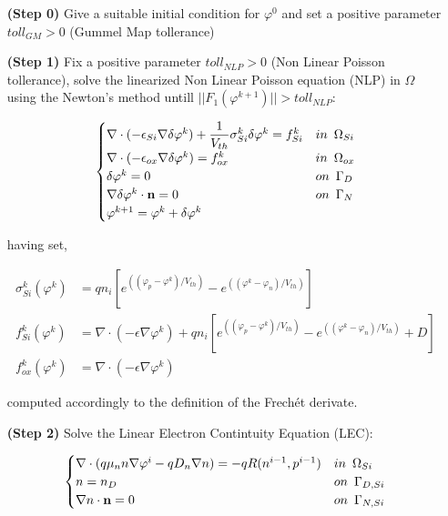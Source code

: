 \begin{itemize}


\item[\bf (Step 0)] Give a suitable initial condition for $\varphi^0$ and set a positive parameter $toll_{GM}>0$ (Gummel Map tollerance)

\item[\bf (Step 1)] Fix a positive parameter $toll_{NLP}>0$ (Non Linear Poisson tollerance), solve the linearized Non Linear Poisson equation (NLP) in $\Omega$ using the Newton's method untill $||F_1(\varphi^{k+1})||>toll_{NLP}$:


\begin{equation}
\label{eq: newton step NLP linear}
\begin{cases}

\nabla \cdot (-\epsilon_{Si} \nabla \delta\varphi^k) 
+   \dfrac{1}{V_{th}} \sigma_{Si}^k\delta\varphi^k 
 =  f_{Si}^k & in \psp{3} \Omega_{Si}
  \\
\nabla \cdot (-\epsilon_{ox} \nabla \delta\varphi^k) =  f_{ox}^k & in \psp{3} \Omega_{ox} 
\\
\delta \varphi^k = 0 & on \psp{3} \Gamma_D 
\\
\nabla \delta \varphi^k \cdot \vect{n} = 0 & on \psp{3} \Gamma_N
\\
\varphi^{k+1}=\varphi^k+\delta \varphi^k
\end{cases} 
\end{equation}

having set,

\begin{align*}
\sigma_{Si}^k(\varphi^{k}) & = qn_i \left[ e^{((\varphi_p-\varphi^k)/V_{th})}-e^{((\varphi^k-\varphi_n)/V_{th})} \right]
\\
f_{Si}^k(\varphi^k) & = \nabla \cdot (-\epsilon \nabla \varphi^k) + qn_i \left[ e^{((\varphi_p-\varphi^k)/V_{th})}-e^{((\varphi^k-\varphi_n)/V_{th})}  + D \right]
\\
f_{ox}^k(\varphi^k) & = \nabla \cdot (-\epsilon \nabla \varphi^k) 
\end{align*}

computed accordingly to the definition of the Frech\'et derivate.


\item[\bf (Step 2)] Solve the Linear Electron Contintuity Equation (LEC):

\begin{equation}
\label{eq: LEC system}
\begin{cases}
 \nabla \cdot ( q\mu_n n \nabla \varphi^i - qD_n \nabla n ) = -qR(n^{i-1},p^{i-1}) & in \psp{3} \Omega_{Si}
 \\
 n = n_D & on \psp{3} \Gamma_{D,Si}
 \\
 \nabla n \cdot \vect{n} = 0 & on \psp{3} \Gamma_{N,Si}
\end{cases}
\end{equation}


\end{itemize}
